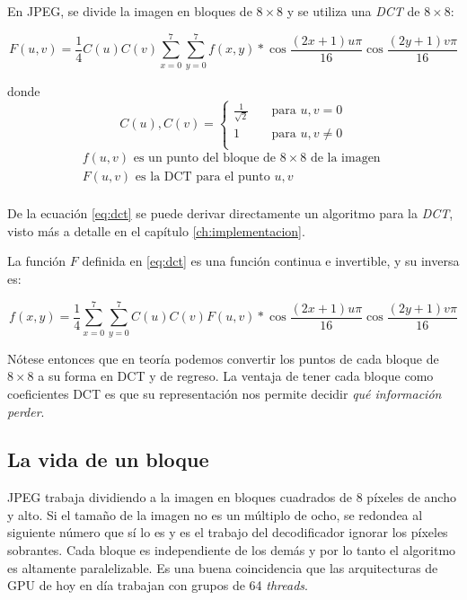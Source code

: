 En JPEG, se divide la imagen en bloques de $8\times8$ y se utiliza una
\emph{DCT} de $8\times8$:

\begin{equation}\label{eq:dct}
F(u, v) = \frac{1}{4} C(u)C(v) \sum_{x=0}^{7}\sum_{y=0}^{7}
f(x,y)*\cos{\frac{(2x+1)u\pi}{16}}\cos{\frac{(2y+1)v\pi}{16}}
\end{equation}

donde \[C(u), C(v) = \begin{cases}
        \frac{1}{\sqrt{2}} & \quad \text{para } u,v = 0\\
        1                  & \quad \text{para } u,v \neq 0\\
\end{cases} \]
\begin{eqnarray*}
    f(u, v) \text{ es un punto del bloque de } 8\times8 \text{ de la imagen }\\
    F(u, v) \text{ es la DCT para el punto } u,v\\
\end{eqnarray*}

De la ecuación \ref{eq:dct} se puede derivar directamente un algoritmo para la
\emph{DCT}, visto más a detalle en el capítulo \ref{ch:implementacion}.

La función $F$ definida en \ref{eq:dct} es una función continua e invertible, y
su inversa es:

\begin{equation}\label{eq:idct}
f(x, y) = \frac{1}{4} \sum_{x=0}^{7}\sum_{y=0}^{7} C(u)C(v) F(u, v)*
\cos{\frac{(2x+1)u\pi}{16}}\cos{\frac{(2y+1)v\pi}{16}}
\end{equation}

Nótese entonces que en teoría podemos convertir los puntos de cada bloque de $8\times8$ a su forma en DCT y de regreso. La ventaja de tener cada bloque como coeficientes DCT es que su representación nos permite decidir \emph{qué información perder}.

\subsection{La vida de un bloque}\label{sub:vida}


JPEG trabaja dividiendo a la imagen en bloques cuadrados de 8 píxeles de ancho
y alto. Si el tamaño de la imagen no es un múltiplo de ocho, se redondea al
siguiente número que sí lo es y es el trabajo del decodificador ignorar los
píxeles sobrantes. Cada bloque es independiente de los demás y por lo tanto el
algoritmo es altamente paralelizable. Es una buena coincidencia que las
arquitecturas de GPU de hoy en día trabajan con grupos de 64 \emph{threads}.

